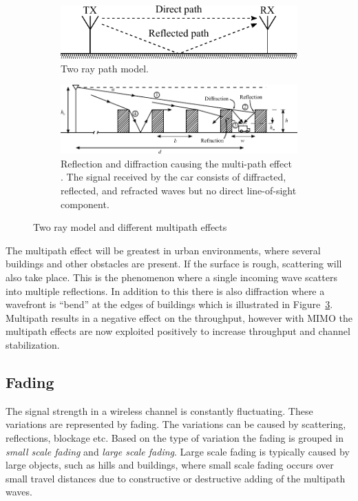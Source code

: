 \begin{figure}[htbp]
    \centering
    \begin{subfigure}[b]{0.6\textwidth} 
     \includegraphics[width=\linewidth]{img/analysis/tworay}
    \caption{Two ray path model.}
    \label{fig:mul_tworay}
    \end{subfigure}
    \centering
    \begin{subfigure}[b]{0.7\textwidth} 
      \includegraphics[width=\linewidth]{img/analysis/parsons_multipath}
      \caption{Reflection and diffraction causing the multi-path effect \cite{parsons2000mobile}. The signal received by the car consists of diffracted, reflected, and refracted waves but no direct line-of-sight component.}
      \label{fig:mul_reflec_diffrac}
    \end{subfigure}
    \caption{Two ray model and different multipath effects}
\end{figure}

The multipath effect will be greatest in urban environments, where several buildings and other obstacles are present. If the surface is rough, scattering will also take place. This is the phenomenon where a single incoming wave scatters into multiple reflections. In addition to this there is also diffraction where a wavefront is ``bend'' at the edges of buildings which is illustrated in Figure~\ref{fig:mul_reflec_diffrac}. Multipath results in a negative effect on the throughput, however with MIMO the multipath effects are now exploited positively to increase throughput and channel stabilization. \cite{} 

\subsection{Fading}
The signal strength in a wireless channel is constantly fluctuating. These variations are represented by fading. The variations can be caused by scattering, reflections, blockage etc. Based on the type of variation the fading is grouped in \emph{small scale fading} and \emph{large scale fading}. Large scale fading is typically caused by large objects, such as hills and buildings, where small scale fading occurs over small travel distances due to constructive or destructive adding of the multipath waves. \cite{} 

